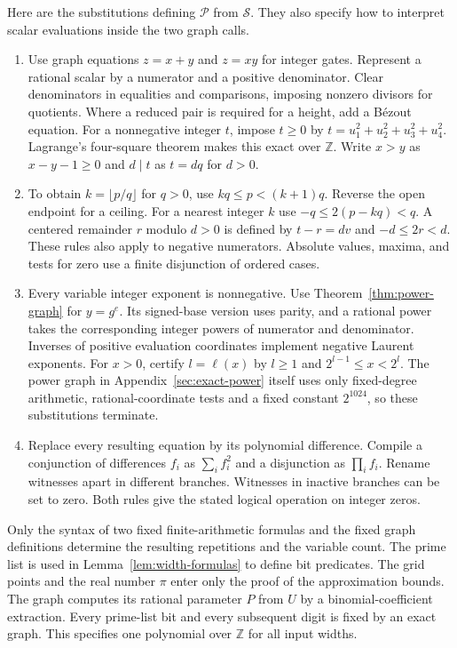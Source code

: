 \documentclass[11pt,letterpaper]{article}
\numberwithin{equation}{section}
\newcommand{\ZZ}{\mathbb Z}
\begin{document}
Here are the substitutions defining $\mathcal P$ from $\mathcal S$. They also specify how to interpret scalar evaluations inside the two graph calls.
\begin{enumerate}
\item Use graph equations $z=x+y$ and $z=xy$ for integer gates. Represent a rational scalar by a numerator and a positive denominator. Clear denominators in equalities and comparisons, imposing nonzero divisors for quotients. Where a reduced pair is required for a height, add a B\'ezout equation. For a nonnegative integer $t$, impose $t\ge0$ by $t=u_1^2+u_2^2+u_3^2+u_4^2$. Lagrange's four-square theorem makes this exact over $\ZZ$. Write $x>y$ as $x-y-1\ge0$ and $d\mid t$ as $t=dq$ for $d>0$.
\item To obtain $k=\lfloor p/q\rfloor$ for $q>0$, use $kq\le p<(k+1)q$. Reverse the open endpoint for a ceiling. For a nearest integer $k$ use $-q\le 2(p-kq)<q$. A centered remainder $r$ modulo $d>0$ is defined by $t-r=dv$ and $-d\le2r<d$. These rules also apply to negative numerators. Absolute values, maxima, and tests for zero use a finite disjunction of ordered cases.
\item Every variable integer exponent is nonnegative. Use Theorem~\ref{thm:power-graph} for $y=g^e$. Its signed-base version uses parity, and a rational power takes the corresponding integer powers of numerator and denominator. Inverses of positive evaluation coordinates implement negative Laurent exponents. For $x>0$, certify $l=\ell(x)$ by $l\ge1$ and $2^{l-1}\le x<2^l$. The power graph in Appendix~\ref{sec:exact-power} itself uses only fixed-degree arithmetic, rational-coordinate tests and a fixed constant $2^{1024}$, so these substitutions terminate.
\item Replace every resulting equation by its polynomial difference. Compile a conjunction of differences $f_i$ as $\sum_i f_i^2$ and a disjunction as $\prod_i f_i$. Rename witnesses apart in different branches. Witnesses in inactive branches can be set to zero. Both rules give the stated logical operation on integer zeros.
\end{enumerate}

Only the syntax of two fixed finite-arithmetic formulas and the fixed graph definitions determine the resulting repetitions and the variable count. The prime list is used in Lemma~\ref{lem:width-formulas} to define bit predicates. The grid points and the real number $\pi$ enter only the proof of the approximation bounds. The graph computes its rational parameter $P$ from $U$ by a binomial-coefficient extraction. Every prime-list bit and every subsequent digit is fixed by an exact graph. This specifies one polynomial over $\ZZ$ for all input widths.
\end{document}
